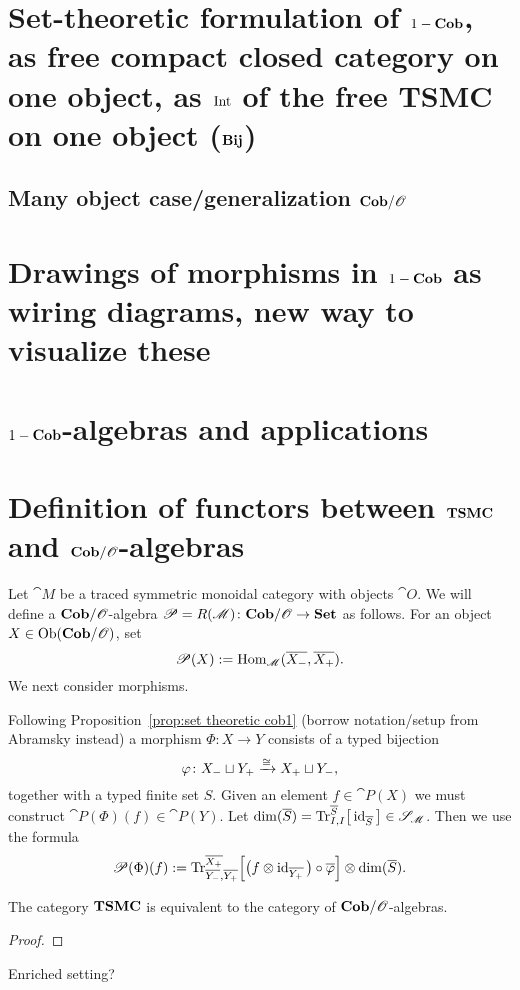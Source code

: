 \section{Set-theoretic formulation of $1-\mathbf{Cob}$, as free compact closed category on one object, as $\operatorname{Int}$ of the free TSMC on one object ($\mathbf{Bij}$)}
\subsection{Many object case/generalization $\mathbf{Cob}/\mathscr{O}$}

\section{Drawings of morphisms in $1-\mathbf{Cob}$ as wiring diagrams, new way to visualize these}

\section{$1-\mathbf{Cob}$-algebras and applications}

\section{Definition of functors between $\mathbf{TSMC}$ and $\mathbf{Cob}/\mathscr{O}$-algebras}

Let $\cat{M}$ be a traced symmetric monoidal category with objects $\cat{O}$. We will define a $\mathbf{Cob}/\mathscr{O}$-algebra $\mathscr{P}=R(\mathscr{M})\colon\mathbf{Cob}/\mathscr{O}\to\mathbf{Set}$ as follows. For an object $X\in\operatorname{Ob}(\mathbf{Cob}/\mathscr{O})$, set 
$$\mathscr{P}(X):=\operatorname{Hom}_{\mathscr{M}}(\overline{{X_-}},\overline{{X_+}}).$$
We next consider morphisms.

Following Proposition~\ref{prop:set theoretic cob1} (borrow notation/setup from Abramsky instead) a morphism $\Phi\colon X\longrightarrow Y$ consists of a typed bijection 
$$\varphi\colon{X_-}\sqcup {Y_+}\xrightarrow{\cong}{X_+}\sqcup {Y_-},$$ 
together with a typed finite set $S$. Given an element $f\in\cat{P}(X)$ we must construct $\cat{P}(\Phi)(f)\in\cat{P}(Y)$. Let $\dim(\overline{S})=\textnormal{Tr}^{\overline{S}}_{I,I}\big[\operatorname{id}_{\overline{S}}\big]\in\mathscr{S}_{\mathscr{M}}$. Then we use the formula
$$\mathscr{P}(\Phi)(f):=
\textnormal{Tr}^{\overline{X_+}}_{\overline{Y_-},\overline{Y_+}}\Big[\big(f\otimes\operatorname{id}_{\overline{Y_+}}\big)\circ\overline{\varphi}\Big]
\otimes\dim(\overline{S}).	
$$

\begin{theorem}
 The category $\mathbf{TSMC}$ is equivalent to the category of $\mathbf{Cob}/\mathscr{O}$-algebras.
\end{theorem}
\begin{proof}
 
\end{proof}
\begin{corollary}
 Enriched setting?
\end{corollary}


